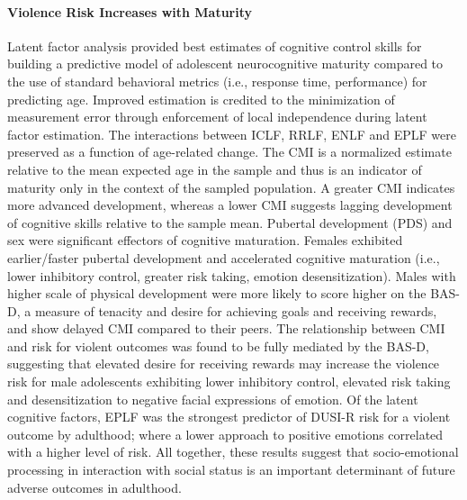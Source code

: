 \documentclass[utf8]{frontiersSCNS} %
\begin{document}
\paragraph*{Violence Risk Increases with Maturity}
Latent factor analysis provided best estimates of cognitive control skills for building a predictive model of adolescent neurocognitive maturity compared to the use of standard behavioral metrics (i.e., response time, performance) for predicting age. Improved estimation is credited to the minimization of measurement error through enforcement of local independence during latent factor estimation. The interactions between ICLF, RRLF, ENLF and EPLF were preserved as a function of age-related change. The CMI is a normalized estimate relative to the mean expected age in the sample and thus is an indicator of maturity only in the context of the sampled population. A greater CMI indicates more advanced development, whereas a lower CMI suggests lagging development of cognitive skills relative to the sample mean. Pubertal development (PDS) and sex were significant effectors of cognitive maturation. Females exhibited earlier/faster pubertal development and accelerated cognitive maturation (i.e., lower inhibitory control, greater risk taking, emotion desensitization). Males with higher scale of physical development were more likely to score higher on the BAS-D, a measure of tenacity and desire for achieving goals and receiving rewards, and show delayed CMI compared to their peers. The relationship between CMI and risk for violent outcomes was found to be fully mediated by the BAS-D, suggesting that elevated desire for receiving rewards may increase the violence risk for male adolescents exhibiting lower inhibitory control, elevated risk taking and desensitization to negative facial expressions of emotion. Of the latent cognitive factors, EPLF was the strongest predictor of DUSI-R risk for a violent outcome by adulthood; where a lower approach to positive emotions correlated with a higher level of risk. All together, these results suggest that socio-emotional processing in interaction with social status is an important determinant of future adverse outcomes in adulthood. 
\vspace{2pt}
\end{document}
